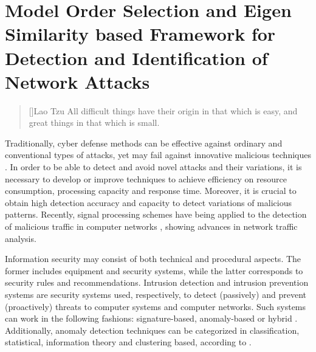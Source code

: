 \chapter{Model Order Selection and Eigen Similarity based Framework for Detection and Identification of Network Attacks}
\label{ch:2_mos_eig_sim}

\begin{quotation}[]{Lao Tzu}
All difficult things have their origin in that which is easy, and great things in that which is small. 
\end{quotation}


Traditionally, cyber defense methods can be effective against ordinary and conventional types of attacks, yet may fail against innovative malicious techniques \cite{lakhina2005mining}. In order to be able to detect and avoid novel attacks and their variations, it is necessary to develop or improve techniques to achieve efficiency on resource consumption, processing capacity and response time. Moreover, it is crucial to obtain high detection accuracy and capacity to detect variations of malicious patterns. Recently, signal processing schemes have being applied to the detection of malicious traffic in computer networks \cite{Lu2009,Huang2009,Zonglin2009,david2011blind,da2012improved,tenorio2013greatest}, showing advances in network traffic analysis.

Information security may consist of both technical and procedural aspects. The former includes equipment and security systems, while the latter corresponds to security rules and recommendations. Intrusion detection and intrusion prevention systems are security systems used, respectively, to detect (passively) and prevent (proactively) threats to computer systems and computer networks. Such systems can work in the following fashions: signature-based, anomaly-based or hybrid \cite{Huang2009,mudzingwa2012study}. Additionally, anomaly detection techniques can be categorized in classification, statistical, information theory and clustering based, according to \cite{bhuyan2014network,ahmed2016survey,osanaiye2016distributed}.

